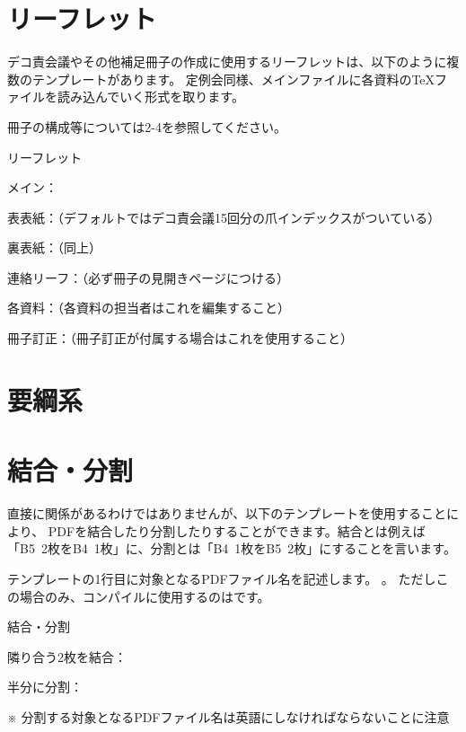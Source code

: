 \begin{multicols*}{2}
\section{リーフレット}
デコ責会議やその他補足冊子の作成に使用するリーフレットは、以下のように複数のテンプレートがあります。
定例会同様、メインファイルに各資料の\TeX ファイルを読み込んでいく形式を取ります。

冊子の構成等については2-4を参照してください。
\begin{framebox-simple}{リーフレット}
    \begin{reitemize}
        \item メイン：
        \item 表表紙：（デフォルトではデコ責会議15回分の爪インデックスがついている）
        \item 裏表紙：（同上）
        \item 連絡リーフ：（必ず冊子の見開きページにつける）
        \item 各資料：（各資料の担当者はこれを編集すること）
        \item 冊子訂正：（冊子訂正が付属する場合はこれを使用すること）
    \end{reitemize}
\end{framebox-simple}


\section{要綱系}

\section{結合・分割}
直接\BunTeX に関係があるわけではありませんが、以下のテンプレートを使用することにより、
PDFを結合したり分割したりすることができます。結合とは例えば「B5~2枚をB4~1枚」に、分割とは「B4~1枚をB5~2枚」にすることを言います。

テンプレートの1行目に対象となるPDFファイル名を記述します。
。
ただしこの場合のみ、コンパイルに使用するのはです。

\begin{framebox-simple}{結合・分割}
\begin{reitemize}
    \item 隣り合う2枚を結合：
    \item 半分に分割：
\end{reitemize}
\noindent ※ 分割する対象となるPDFファイル名は英語にしなければならないことに注意
\end{framebox-simple}

\end{multicols*}